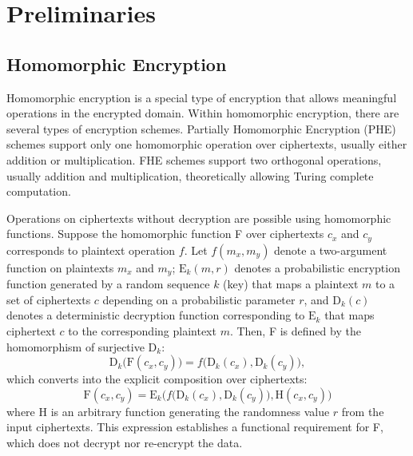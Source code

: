 \section{Preliminaries}\label{s:preliminaries}

\subsection{Homomorphic Encryption}

Homomorphic encryption is a special type of encryption that allows meaningful operations in the encrypted domain. Within homomorphic encryption, there are several types of encryption schemes. Partially Homomorphic Encryption (PHE) schemes support only one homomorphic operation over ciphertexts, usually either addition or multiplication. FHE schemes support two orthogonal operations, usually addition and multiplication, theoretically allowing Turing complete computation.

Operations on ciphertexts without decryption are possible using homomorphic functions. Suppose the homomorphic function F over ciphertexts $c_x$ and $c_y$ corresponds to plaintext operation $f$.
Let $f(m_x,m_y)$ denote a two-argument function on plaintexts $m_x$ and $m_y$; $\text{E}_k(m,r)$ denotes a probabilistic encryption function generated by a random sequence $k$ (key) that maps a plaintext $m$ to a set of ciphertexts $c$ depending on a probabilistic parameter $r$, and $\text{D}_k(c)$ denotes a deterministic decryption function corresponding to $\text{E}_k$ that maps ciphertext $c$ to the corresponding plaintext $m$. Then,
F is defined by the homomorphism of surjective
$\text{D}_k$:
\begin{equation*}
\text{D}_k\big(\text{F}(c_x,c_y)\big) = 
f\big(\text{D}_k(c_x), \text{D}_k(c_y)\big),
\end{equation*}
which converts into the
explicit composition over ciphertexts:
\begin{equation*}\label{e:chop}
\text{F}(c_x,c_y) = 
\text{E}_k\Big(f\big(\text{D}_k(c_x), \text{D}_k(c_y)\big),\text{H}(c_x,c_y)\Big)
\end{equation*}
where H is an arbitrary function generating the randomness value $r$ from the input ciphertexts. This expression establishes a functional requirement for F, which does not decrypt nor re-encrypt the data.


